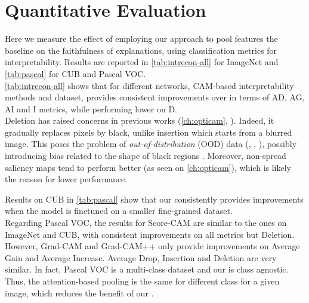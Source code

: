 \section{Quantitative Evaluation}
\label{sec:ca_quant}

Here we measure the effect of employing our \Ours approach to pool features \vs the baseline \gap 
on the faithfulness of explanations, using classification metrics for interpretability. Results are 
reported in \autoref{tab:intrecon-all} for ImageNet and  \autoref{tab:pascal} for CUB and Pascal VOC.\\



\noindent \autoref{tab:intrecon-all} shows that for different networks, CAM-based interpretability 
methods and dataset, \Ours provides consistent improvements over \gap in terms of AD, AG, AI and I 
metrics, while performing lower on D. \\

\noindent Deletion has raised concerns in previous works (\autoref{ch:opticam}, 
\cite{chefer2021transformer}). Indeed, it gradually replaces pixels by black, unlike insertion which 
starts from a blurred image. This poses the problem of \emph{out-of-distribution} (OOD) data 
(\cite{gomez2022metrics}, \cite{hase2021outofdistribution}, \cite{qiu2021resisting}), possibly 
introducing bias related to the shape of black regions \autocite{rong2022consistent}. Moreover, 
non-spread saliency maps tend to perform better (as seen on \autoref{ch:opticam}), which is likely 
the reason for lower performance. 



\noindent Results on CUB in \autoref{tab:pascal} show that our \Ours consistently provides 
improvements when the model is finetuned on a smaller fine-grained dataset.\\

\noindent Regarding Pascal VOC, the results for Score-CAM are similar to the ones on ImageNet and 
CUB, with consistent improvements on all metrics but Deletion. 
However, Grad-CAM and Grad-CAM++ only provide improvements on Average Gain and Average Increase. 
Average Drop, Insertion and Deletion are very similar.
In fact, Pascal VOC is a multi-class dataset and  our \Ours is class agnostic. Thus, the 
attention-based pooling is the same for different class for a given image, which reduces the 
benefit of our \Ours.\\

